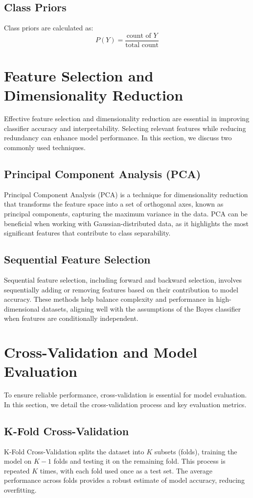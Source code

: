 \documentclass[conference]{IEEEtran}
\begin{document}
	\subsection{Class Priors}\label{CP}
	Class priors are calculated as:
	\[
	P(Y) = \frac{\text{count of } Y}{\text{total count}}
	\]
	
	\section{Feature Selection and Dimensionality Reduction}
	Effective feature selection and dimensionality reduction are essential in improving classifier accuracy and interpretability. Selecting relevant features while reducing redundancy can enhance model performance. In this section, we discuss two commonly used techniques.
	
	\subsection{Principal Component Analysis (PCA)}
	Principal Component Analysis (PCA) is a technique for dimensionality reduction that transforms the feature space into a set of orthogonal axes, known as principal components, capturing the maximum variance in the data. PCA can be beneficial when working with Gaussian-distributed data, as it highlights the most significant features that contribute to class separability.
	
	\subsection{Sequential Feature Selection}
	Sequential feature selection, including forward and backward selection, involves sequentially adding or removing features based on their contribution to model accuracy. These methods help balance complexity and performance in high-dimensional datasets, aligning well with the assumptions of the Bayes classifier when features are conditionally independent.
	
	\section{Cross-Validation and Model Evaluation}
	To ensure reliable performance, cross-validation is essential for model evaluation. In this section, we detail the cross-validation process and key evaluation metrics.
	
	\subsection{K-Fold Cross-Validation}
	K-Fold Cross-Validation splits the dataset into \( K \) subsets (folds), training the model on \( K-1 \) folds and testing it on the remaining fold. This process is repeated \( K \) times, with each fold used once as a test set. The average performance across folds provides a robust estimate of model accuracy, reducing overfitting.
	
\end{document}
